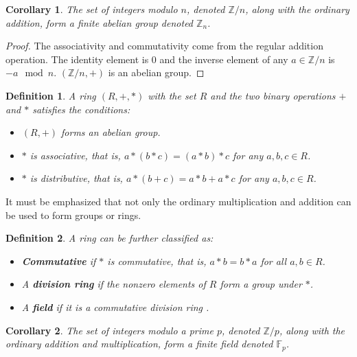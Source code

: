 \documentclass{ufsctex/ufsctex}
\newtheorem{definition}{Definition}
\newtheorem{corollary}{Corollary}
\begin{document}
\begin{corollary}
The set of integers modulo $n$, denoted $\mathbb{Z}/n$, along with the ordinary
addition, form a finite abelian group denoted $\mathbb{Z}_n$.
\end{corollary}

\begin{proof}
The associativity and commutativity come from the regular addition operation.
The identity element is $0$ and the inverse element of any $a \in \mathbb{Z}/n$
is $-a \mod n$. $(\mathbb{Z}/n, +)$ is an abelian group.
\end{proof}

\begin{definition}
A ring $(R, +, *)$ with the set $R$ and the two binary operations $+$ and $*$
satisfies the conditions:
\begin{itemize}
	\item $(R, +)$ forms an abelian group.
	\item $*$ is associative, that is, $a*(b*c) = (a*b)*c$ for any $a, b, c \in
	R$.
	\item $*$ is distributive, that is, $a*(b+c) = a*b + a*c$ for any $a, b, c
	\in R$.
\end{itemize}
\end{definition}

It must be emphasized that not only the ordinary multiplication and addition
can be used to form groups or rings.

\begin{definition}
A ring can be further classified as:
\begin{itemize}
	\item \textbf{Commutative} if $*$ is commutative, that is, $a*b = b*a$ for
	all $a, b \in R$.
	\item A \textbf{division ring} if the nonzero elements of $R$ form a group
	under $*$.
	\item A \textbf{field} if it is a commutative division ring .
\end{itemize}
\end{definition}

\begin{corollary}
The set of integers modulo a prime $p$, denoted $\mathbb{Z}/p$, along with the
ordinary addition and multiplication, form a finite field denoted
$\mathbb{F}_p$.
\end{corollary}
\end{document}
